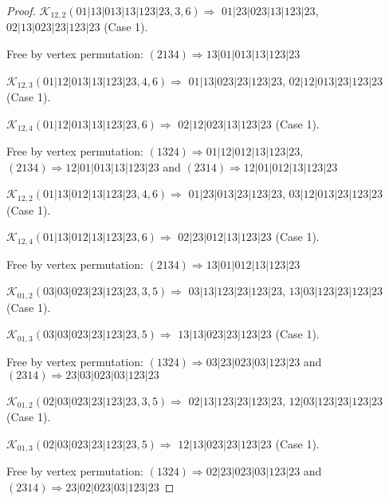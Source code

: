 \documentclass[12pt]{article}
\theoremstyle{plain}
\theoremstyle{definition}
\theoremstyle{remark}
\newcommand{\fancy}[1]{\mathcal{#1}}
\def\K{\fancy{K}}
\begin{document}
\begin{proof}
	$\K_{12,2}(01|13|013|13|123|23,3, 6)\Rightarrow $ $01|23|023|13|123|23$, $02|13|023|23|123|23$ (Case 1).
	
	
	
	Free by vertex permutation: $(2 1 3 4)\Rightarrow 13|01|013|13|123|23$
	
	
	
	\bigskip
	
	$\K_{12,3}(01|12|013|13|123|23,4, 6)\Rightarrow $ $01|13|023|23|123|23$, $02|12|013|23|123|23$ (Case 1).
	
	$\K_{12,4}(01|12|013|13|123|23,6)\Rightarrow $ $02|12|023|13|123|23$ (Case 1).
	
	
	
	Free by vertex permutation: $(1 3 2 4)\Rightarrow 01|12|012|13|123|23$, $(2 1 3 4)\Rightarrow 12|01|013|13|123|23$ and $(2 3 1 4)\Rightarrow 12|01|012|13|123|23$
	
	
	
	\bigskip
	
	$\K_{12,2}(01|13|012|13|123|23,4, 6)\Rightarrow $ $01|23|013|23|123|23$, $03|12|013|23|123|23$ (Case 1).
	
	$\K_{12,4}(01|13|012|13|123|23,6)\Rightarrow $ $02|23|012|13|123|23$ (Case 1).
	
	
	
	Free by vertex permutation: $(2 1 3 4)\Rightarrow 13|01|012|13|123|23$
	
	
	
	\bigskip
	
	$\K_{01,2}(03|03|023|23|123|23,3, 5)\Rightarrow $ $03|13|123|23|123|23$, $13|03|123|23|123|23$ (Case 1).
	
	$\K_{01,3}(03|03|023|23|123|23,5)\Rightarrow $ $13|13|023|23|123|23$ (Case 1).
	
	
	
	Free by vertex permutation: $(1 3 2 4)\Rightarrow 03|23|023|03|123|23$ and $(2 3 1 4)\Rightarrow 23|03|023|03|123|23$
	
	
	
	\bigskip
	
	$\K_{01,2}(02|03|023|23|123|23,3, 5)\Rightarrow $ $02|13|123|23|123|23$, $12|03|123|23|123|23$ (Case 1).
	
	$\K_{01,3}(02|03|023|23|123|23,5)\Rightarrow $ $12|13|023|23|123|23$ (Case 1).
	
	
	
	Free by vertex permutation: $(1 3 2 4)\Rightarrow 02|23|023|03|123|23$ and $(2 3 1 4)\Rightarrow 23|02|023|03|123|23$
	
	
	

\end{proof}
\end{document}
